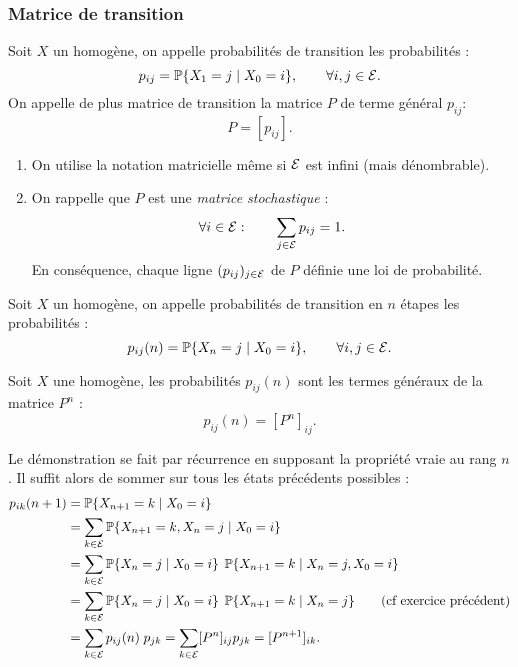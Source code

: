 \subsubsection{Matrice de transition}

\begin{definition}
  Soit $X$ un \cM homogène, on appelle probabilités de transition les probabilités :
  $$
  p_{ij} = \operatorname{\mathbb{P}}\{X_1 = j \mid X_0 = i\}, \qquad \forall i, j \in \mathcal{E}.
  $$
  On appelle de plus matrice de transition la matrice $P$ de terme général $p_{ij}$:
  $$
  P = [p_{ij}].
  $$
\end{definition}

\remarks
\begin{enumerate}
  \item On utilise la notation matricielle même si $\mathcal{E}$ est infini (mais dénombrable).
  \item On rappelle que $P$ est une {\em matrice stochastique} : 
  $$
  \forall i \in \mathcal{E}: \qquad \sum_{j \in \mathcal{E}} p_{ij} = 1.
  $$
  En conséquence, chaque ligne $(p_{ij})_{j \in \mathcal{E}}$ de $P$ définie une loi de probabilité.
\end{enumerate}

\begin{definition}
  Soit $X$ un \cM homogène, on appelle probabilités de transition en $n$ étapes les probabilités :
  $$
  p_{ij}(n) = \operatorname{\mathbb{P}}\{X_n = j \mid X_0 = i\}, \qquad \forall i, j \in \mathcal{E}.  
  $$
\end{definition}

\begin{proposition} \label{prop:transitionNEtapes}
  Soit $X$ une \cM homogène, les probabilités $p_{ij}(n)$ sont les termes généraux de la matrice $P^n$ : 
  $$
  p_{ij}(n) = [P^n]_{ij}.
  $$
\end{proposition}

\proof
Le démonstration se fait par récurrence en supposant la propriété vraie au rang $n$. Il suffit alors de sommer sur tous les états précédents possibles : 
\begin{align*}
  p_{ik}(n+1) 
  & = \operatorname{\mathbb{P}}\{X_{n+1} = k \mid X_0=i\} \\
  & = \sum_{k \in \mathcal{E}} \operatorname{\mathbb{P}}\{X_{n+1} = k, X_n = j \mid X_0=i\} \\
  & = \sum_{k \in \mathcal{E}} \operatorname{\mathbb{P}}\{X_n = j \mid X_0=i\} \; \operatorname{\mathbb{P}}\{X_{n+1} = k \mid X_n = j, X_0=i\} \\
  & = \sum_{k \in \mathcal{E}} \operatorname{\mathbb{P}}\{X_n = j \mid X_0=i\} \; \operatorname{\mathbb{P}}\{X_{n+1} = k \mid X_n = j\} \qquad (\text{cf exercice précédent})\\
  & = \sum_{k \in \mathcal{E}} p_{ij}(n) \; p_{jk} = \sum_{k \in \mathcal{E}} [P^n]_{ij} p_{jk} = [P^{n+1}]_{ik}.
\end{align*}
\eproof

